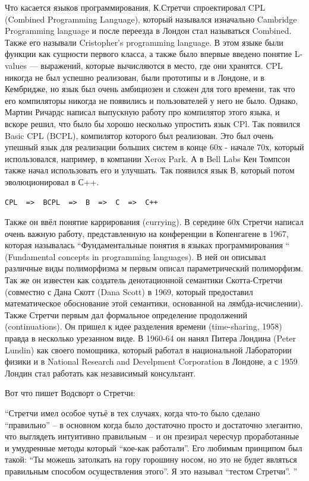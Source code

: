 \documentclass[14pt]{matmex-diploma-custom}
\begin{document}
Что касается языков программирования, К.Стретчи спроектировал CPL (Combined Programming Language), который назывался изначально Cambridge Programming language и после переезда в Лондон стал называться Combined. Также его называли Cristopher’s programming language. В этом языке были функции как сущности первого класса, а также было впервые введено понятие L-values --- выражений, которые вычисляются в место, где они хранятся. CPL никогда не был успешно реализован, были прототипы и в Лондоне, и в Кембридже, но язык был очень амбициозен и сложен для того времени, так что его компиляторы никогда не появились и пользователей у него не было. Однако, Мартин Ричардс написал выпускную работу про компилятор этого языка, и вскоре решил, что было бы хорошо несколько упростить язык CPl. Так появился Basic CPL (BCPL), компилятор которого был реализован. Это был очень упешный язык для реализации больших систем в конце 60х - начале 70х, который использовался, например, в компании Xerox Park. А в Bell Labs Кен Томпсон также начал использовать его и улучшать. Так появился язык В, который потом эволюционировал в С++.

\begin{verbatim}
CPL  =>  BCPL  =>  B  =>  C  =>  C++
\end{verbatim}

Также он ввёл понятие каррирования (currying). В середине 60х Стретчи написал очень важную работу, представленную на конференции в Копенгагене в 1967, которая называлась  “Фундаментальные понятия в языках программирования “ (Fundamental concepts in programming languages). В ней он описывал различные виды полиморфизма м первым описал параметрический полиморфизм. Так же он известен как создатель денотационной семантики Скотта-Стретчи (совместно с Дана Скотт (Dana Scott) в 1969, который предоставил математическое обоснование этой семантики, основанной на лямбда-исчислении). Также Стретчи первым дал формальное определение продолжений (continuations). Он пришел к идее разделения времени (time-sharing, 1958) правда в несколько урезанном виде. В 1960-64 он нанял Питера Лондина (Peter Lundin) как своего помощника, который работал в национальной Лаборатории физики и в National Research and Develpment Corporation в Лондоне, а с 1959 Лондин стал работать как независимый консультант. 

\begin{framed}
Вот что пишет Водсворт о Стретчи:

“Стретчи имел особое чутьё в тех случаях, когда что-то было сделано “правильно” -- в основном когда было достаточно просто и достаточно элегантно, что выглядеть интуитивно правильным -- и он презирал чересчур проработанные и умудренные методы который “кое-как работали”. Его любимым принципом был такой: “Ты можешь затолкать на гору горошину носом, но это не будет являться правильным способом осуществления этого”. Я это называл “тестом Стретчи”.
”
\end{framed}
\end{document}
